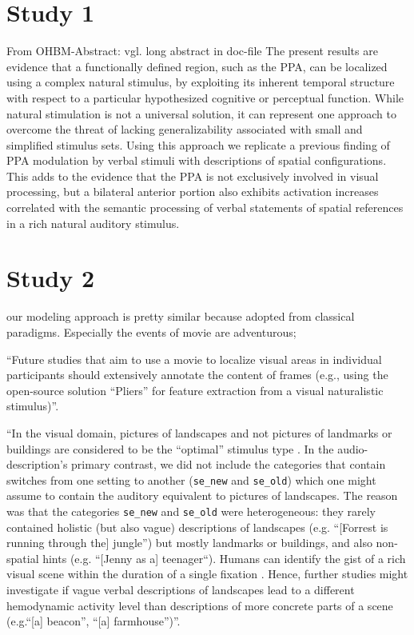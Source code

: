 \section{Study 1}
%
From OHBM-Abstract: vgl. long abstract in doc-file
%
The present results are evidence that a functionally defined region, such as the
PPA, can be localized using a complex natural stimulus, by exploiting its
inherent temporal structure with respect to a particular hypothesized cognitive
or perceptual function.
%
While natural stimulation is not a universal solution, it can represent one
approach to overcome the threat of lacking generalizability associated with
small and simplified stimulus sets.
%
Using this approach we replicate a previous finding of PPA modulation by verbal
stimuli with descriptions of spatial configurations.
%
This adds to the evidence that the PPA is not exclusively involved in visual
processing, but a bilateral anterior portion also exhibits activation increases
correlated with the semantic processing of verbal statements of spatial
references in a rich natural auditory stimulus.


\section{Study 2}

our modeling approach is pretty similar because adopted from classical
paradigms. Especially the events of movie are adventurous;

``Future studies that aim to use a movie to localize visual areas in individual
participants should extensively annotate the content of frames (e.g., using the
open-source solution ``Pliers''\citep{mcnamara2017developing} for feature
extraction from a visual naturalistic stimulus)''.


``In the visual domain, pictures of landscapes and not pictures of landmarks or
buildings are considered to be the ``optimal'' stimulus type
\citep{epstein2008parahippocampal}.
In the audio-description's primary contrast, we did not include the categories
that contain switches from one setting to another (\texttt{se\_new} and
\texttt{se\_old}) which one might assume to contain the auditory equivalent to
pictures of landscapes.
The reason was that the categories \texttt{se\_new} and \texttt{se\_old} were
heterogeneous: they rarely contained holistic (but also vague) descriptions of
landscapes (e.g.  ``[Forrest is running through the] jungle'') but mostly
landmarks or buildings, and also non-spatial hints (e.g. ``[Jenny as a]
teenager``).
Humans can identify the gist of a rich visual scene within the duration of a
single fixation \citep{henderson2003human}.
%
Hence, further studies might investigate if vague verbal descriptions of
landscapes lead to a different hemodynamic activity level than descriptions of
more concrete parts of a scene (e.g.``[a] beacon'', ``[a] farmhouse'')''.

